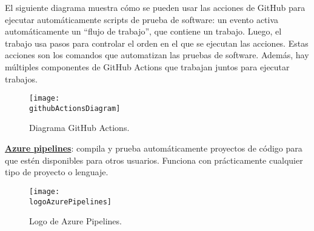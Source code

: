 \begin{compactitem}
    El siguiente diagrama muestra cómo se pueden usar las acciones de GitHub para ejecutar automáticamente scripts de prueba de software: un evento activa automáticamente un “flujo de trabajo”, que contiene un trabajo. Luego, el trabajo usa pasos para controlar el orden en el que se ejecutan las acciones. Estas acciones son los comandos que automatizan las pruebas de software. Además, hay múltiples componentes de GitHub Actions que trabajan juntos para ejecutar trabajos.
    \begin{figure}[h]
        \centering
        \texttt{[image: \\githubActionsDiagram]}
        \caption{Diagrama GitHub Actions.}
    \end{figure}
    \item \textbf{\underline{Azure pipelines}}: compila y prueba automáticamente proyectos de código para que estén disponibles para otros usuarios. Funciona con prácticamente cualquier tipo de proyecto o lenguaje.
    
    \begin{figure}[h]
        \centering
        \texttt{[image: \\logoAzurePipelines]}
        \caption{Logo de Azure Pipelines.}
    \end{figure}
    

\end{compactitem}

